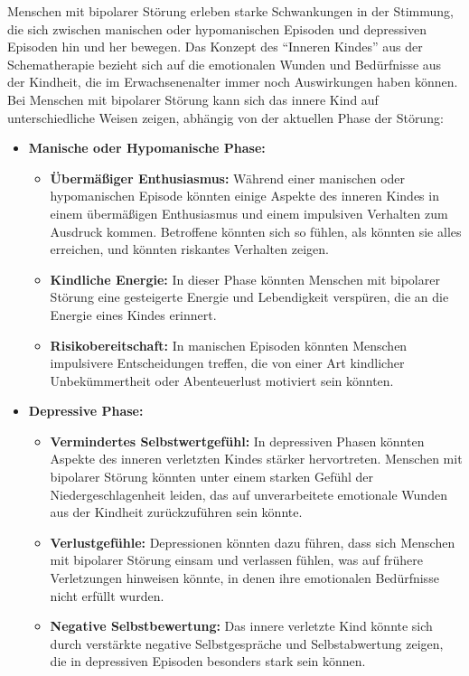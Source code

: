Menschen mit bipolarer Störung erleben starke Schwankungen in der Stimmung, die sich zwischen manischen oder hypomanischen Episoden und depressiven Episoden hin und her bewegen. Das Konzept des \enquote{Inneren Kindes} aus der Schematherapie bezieht sich auf die emotionalen Wunden und Bedürfnisse aus der Kindheit, die im Erwachsenenalter immer noch Auswirkungen haben können. Bei Menschen mit bipolarer Störung kann sich das innere Kind auf unterschiedliche Weisen zeigen, abhängig von der aktuellen Phase der Störung:
\begin{itemize}
    \item \textbf{Manische oder Hypomanische Phase:}
        \begin{itemize}
            \item \textbf{Übermäßiger Enthusiasmus:} Während einer manischen oder hypomanischen Episode könnten einige Aspekte des inneren Kindes in einem übermäßigen Enthusiasmus und einem impulsiven Verhalten zum Ausdruck kommen. Betroffene könnten sich so fühlen, als könnten sie alles erreichen, und könnten riskantes Verhalten zeigen.
            \item \textbf{Kindliche Energie:} In dieser Phase könnten Menschen mit bipolarer Störung eine gesteigerte Energie und Lebendigkeit verspüren, die an die Energie eines Kindes erinnert.
            \item \textbf{Risikobereitschaft:} In manischen Episoden könnten Menschen impulsivere Entscheidungen treffen, die von einer Art kindlicher Unbekümmertheit oder Abenteuerlust motiviert sein könnten.
        \end{itemize}

    \item \textbf{Depressive Phase:}
        \begin{itemize}
            \item \textbf{Vermindertes Selbstwertgefühl:} In depressiven Phasen könnten Aspekte des inneren verletzten Kindes stärker hervortreten. Menschen mit bipolarer Störung könnten unter einem starken Gefühl der Niedergeschlagenheit leiden, das auf unverarbeitete emotionale Wunden aus der Kindheit zurückzuführen sein könnte.
            \item \textbf{Verlustgefühle:} Depressionen könnten dazu führen, dass sich Menschen mit bipolarer Störung einsam und verlassen fühlen, was auf frühere Verletzungen hinweisen könnte, in denen ihre emotionalen Bedürfnisse nicht erfüllt wurden.
            \item \textbf{Negative Selbstbewertung:} Das innere verletzte Kind könnte sich durch verstärkte negative Selbstgespräche und Selbstabwertung zeigen, die in depressiven Episoden besonders stark sein können.
        \end{itemize}
\end{itemize}
